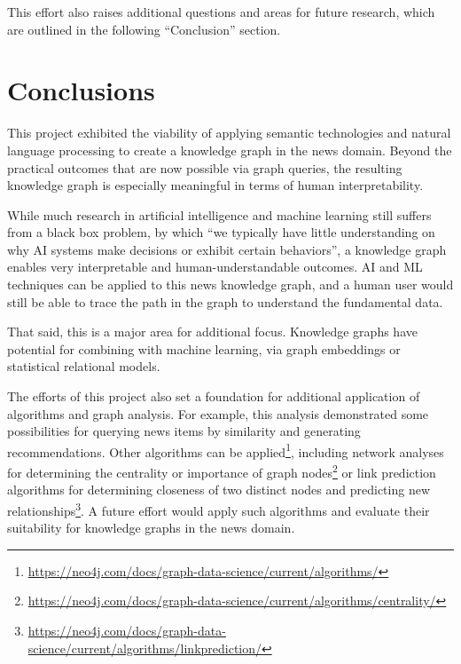 \documentclass[11pt]{article}
\begin{document}
  This effort also raises additional questions and areas for future research, which are outlined in the following ``Conclusion'' section.


\section{Conclusions}

This project exhibited the viability of applying semantic technologies and natural language processing to create a knowledge graph in the news domain. Beyond the practical outcomes that are now possible via graph queries, the resulting knowledge graph is especially meaningful in terms of human interpretability.

While much research in artificial intelligence and machine learning still suffers from a black box problem, by which ``we typically have little understanding on why AI systems make decisions or exhibit certain behaviors''\cite{rai2020explainable}, a knowledge graph enables very interpretable and human-understandable outcomes. AI and ML techniques can be applied to this news knowledge graph, and a human user would still be able to trace the path in the graph to understand the fundamental data.

That said, this is a major area for additional focus. Knowledge graphs have potential for combining with machine learning, via graph embeddings or statistical relational models\cite{wang2017knowledge}\cite{nickel2015review}.

The efforts of this project also set a foundation for additional application of algorithms and graph analysis. For example, this analysis demonstrated some possibilities for querying news items by similarity and generating recommendations. Other algorithms can be applied\footnote{\url{https://neo4j.com/docs/graph-data-science/current/algorithms/}}, including network analyses for determining the centrality or importance of graph nodes\footnote{\url{https://neo4j.com/docs/graph-data-science/current/algorithms/centrality/}} or link prediction algorithms for determining closeness of two distinct nodes and predicting new relationships\footnote{\url{https://neo4j.com/docs/graph-data-science/current/algorithms/linkprediction/}}. A future effort would apply such algorithms and evaluate their suitability for knowledge graphs in the news domain.
\end{document}
